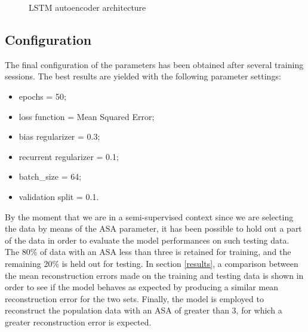 \documentclass{article}
\begin{document}
\begin{multicols*}{2}
\begin{figure}[H]
	\centering
	\caption{LSTM autoencoder architecture}
	\label{fig:model}
\end{figure}

\subsection{Configuration} 
The final configuration of the parameters has been obtained after several training sessions.
The best results are yielded with the following parameter settings: 
\begin{itemize}
		\setlength\itemsep{-0.1em}
	\item epochs = 50;
	\item loss function =  Mean Squared Error;
	\item bias regularizer = 0.3;
	\item recurrent regularizer = 0.1;
	\item batch\_size = 64;
	\item validation split = 0.1.
\end{itemize}

By the moment that we are in a semi-supervised context since we are selecting the data by means of the ASA parameter, it has been possible to hold out a part of the data in order to evaluate the model performances on such testing data. The 80\% of data with an ASA less than three is retained for training, and the remaining 20\% is held out for testing.
In section \ref{results}, a comparison between the mean reconstruction errors made on the training and testing data is shown in order to see if the model behaves as expected by producing a similar mean reconstruction error for the two sets.
Finally, the model is employed to reconstruct the population data with an ASA of greater than 3, for which a greater reconstruction error is expected.


\end{multicols*}
\end{document}
